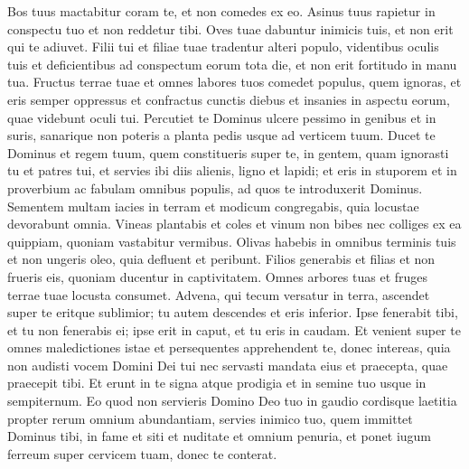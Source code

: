 \begin{biblechapter}
\begin{biblechapter}
\begin{biblechapter}
\begin{biblechapter}
\begin{biblechapter}
\begin{biblechapter}
\begin{biblechapter}
\begin{biblechapter}
\begin{biblechapter}
\begin{biblechapter}
\begin{biblechapter}
\begin{biblechapter}
\begin{biblechapter}
\begin{biblechapter}
\begin{biblechapter}
\begin{biblechapter}
\begin{biblechapter}
\begin{biblechapter}
\begin{biblechapter}
\begin{biblechapter}
\begin{biblechapter}
\begin{biblechapter}
\begin{biblechapter}
\begin{biblechapter}
\begin{biblechapter}
\begin{biblechapter}
\begin{biblechapter}
\begin{biblechapter}
\verse Bos tuus mactabitur coram te, et non comedes ex eo. Asinus tuus rapietur in conspectu tuo et non reddetur tibi. Oves tuae dabuntur inimicis tuis, et non erit qui te adiuvet. 
\verse Filii tui et filiae tuae tradentur alteri populo, videntibus oculis tuis et deficientibus ad conspectum eorum tota die, et non erit fortitudo in manu tua. 
\verse Fructus terrae tuae et omnes labores tuos comedet populus, quem ignoras, et eris semper oppressus et confractus cunctis diebus 
\verse et insanies in aspectu eorum, quae videbunt oculi tui. 
\verse Percutiet te Dominus ulcere pessimo in genibus et in suris, sanarique non poteris a planta pedis usque ad verticem tuum.
 \verse Ducet te Dominus et regem tuum, quem constitueris super te, in gentem, quam ignorasti tu et patres tui, et servies ibi diis alienis, ligno et lapidi; 
\verse et eris in stuporem et in proverbium ac fabulam omnibus populis, ad quos te introduxerit Dominus.
 \verse Sementem multam iacies in terram et modicum congregabis, quia locustae devorabunt omnia. 
\verse Vineas plantabis et coles et vinum non bibes nec colliges ex ea quippiam, quoniam vastabitur vermibus. 
\verse Olivas habebis in omnibus terminis tuis et non ungeris oleo, quia defluent et peribunt. 
\verse Filios generabis et filias et non frueris eis, quoniam ducentur in captivitatem. 
 \verse Omnes arbores tuas et fruges terrae tuae locusta consumet. 
\verse Advena, qui tecum versatur in terra, ascendet super te eritque sublimior; tu autem descendes et eris inferior. 
\verse Ipse fenerabit tibi, et tu non fenerabis ei; ipse erit in caput, et tu eris in caudam.
 \verse Et venient super te omnes maledictiones istae et persequentes apprehendent te, donec intereas, quia non audisti vocem Domini Dei tui nec servasti mandata eius et praecepta, quae praecepit tibi. 
\verse Et erunt in te signa atque prodigia et in semine tuo usque in sempiternum.
 \verse Eo quod non servieris Domino Deo tuo in gaudio cordisque laetitia propter rerum omnium abundantiam, 
\verse servies inimico tuo, quem immittet Dominus tibi, in fame et siti et nuditate et omnium penuria, et ponet iugum ferreum super cervicem tuam, donec te conterat.

\end{biblechapter}
\end{biblechapter}
\end{biblechapter}
\end{biblechapter}
\end{biblechapter}
\end{biblechapter}
\end{biblechapter}
\end{biblechapter}
\end{biblechapter}
\end{biblechapter}
\end{biblechapter}
\end{biblechapter}
\end{biblechapter}
\end{biblechapter}
\end{biblechapter}
\end{biblechapter}
\end{biblechapter}
\end{biblechapter}
\end{biblechapter}
\end{biblechapter}
\end{biblechapter}
\end{biblechapter}
\end{biblechapter}
\end{biblechapter}
\end{biblechapter}
\end{biblechapter}
\end{biblechapter}
\end{biblechapter}
